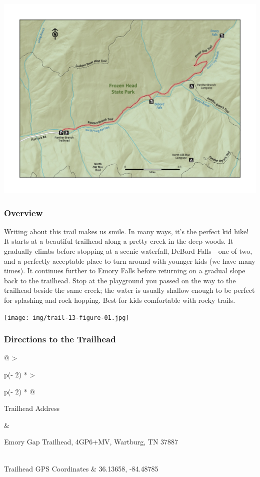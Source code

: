 \documentclass[
  letterpaper,
  DIV=11,
  numbers=noendperiod]{scrartcl}
\begin{document}
\includegraphics{maps/trail-13-map.jpeg}

\hypertarget{overview-12}{%
\subsubsection{Overview}\label{overview-12}}

Writing about this trail makes us smile. In many ways, it's the perfect
kid hike! It starts at a beautiful trailhead along a pretty creek in the
deep woods. It gradually climbs before stopping at a scenic waterfall,
DeBord Falls---one of two, and a perfectly acceptable place to turn
around with younger kids (we have many times). It continues further to
Emory Falls before returning on a gradual slope back to the trailhead.
Stop at the playground you passed on the way to the trailhead beside the
same creek; the water is usually shallow enough to be perfect for
splashing and rock hopping. Best for kids comfortable with rocky trails.

\texttt{[image: img/trail-13-figure-01.jpg]}

\hypertarget{directions-to-the-trailhead-12}{%
\subsubsection{Directions to the
Trailhead}\label{directions-to-the-trailhead-12}}

\begin{longtable}[]{@{}
  >{\raggedright\arraybackslash}p{(\columnwidth - 2\tabcolsep) * }
  >{\raggedright\arraybackslash}p{(\columnwidth - 2\tabcolsep) * }@{}}
\toprule\noalign{}
\begin{minipage}[b]{\linewidth}\raggedright
Trailhead Address
\end{minipage} & \begin{minipage}[b]{\linewidth}\raggedright
Emory Gap Trailhead, 4GP6+MV, Wartburg, TN 37887
\end{minipage} \\
\midrule\noalign{}
\endhead
\bottomrule\noalign{}
\endlastfoot
Trailhead GPS Coordinates & 36.13658, -84.48785 \\
\end{longtable}
\end{document}
